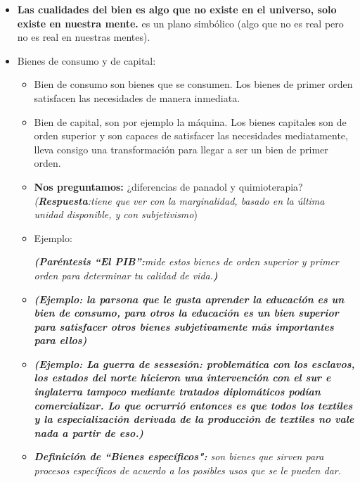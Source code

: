 \begin{itemize}
    \item \textbf{Las cualidades del bien es algo que no existe en el universo, solo existe en nuestra mente.} es un plano simbólico (algo que no es real pero no es real en nuestras mentes).
    \item Bienes de consumo y de capital:
    \begin{itemize}
        \item Bien de consumo son bienes que se consumen. Los bienes de primer orden satisfacen las necesidades de manera inmediata.
        \item Bien de capital, son por ejemplo la máquina. Los bienes capitales son de orden superior y son capaces de satisfacer las necesidades mediatamente, lleva consigo una transformación para llegar a ser un bien de primer orden.
        \item \textbf{Nos preguntamos:} ¿diferencias de panadol y quimioterapia? \emph{(\textbf{Respuesta}:tiene que ver con la marginalidad, basado en la última unidad disponible, y con subjetivismo})
        \item Ejemplo:
        \emph{\textbf{(Paréntesis ``El PIB'':}mide estos bienes de orden superior y primer orden para determinar tu calidad de vida.\textbf{)}}
        
        
        \item \textbf{\emph{(Ejemplo: la parsona que le gusta aprender la educación es un bien de consumo, para otros la educación es un bien superior para satisfacer otros bienes subjetivamente más importantes para ellos)}}

        
        \item \textbf{\emph{(Ejemplo: La guerra de sessesión: problemática con los esclavos, los estados del norte hicieron una intervención con el sur e inglaterra tampoco mediante tratados diplomáticos podían comercializar. Lo que ocrurrió entonces es que todos los textiles y la especialización derivada de la producción de textiles no vale nada a partir de eso.)}}
        
        
        \item \emph{\textbf{Definición de ``Bienes específicos":} son bienes que sirven para procesos específicos de acuerdo a los posibles usos que se le pueden dar.}
    \end{itemize}
\end{itemize}
